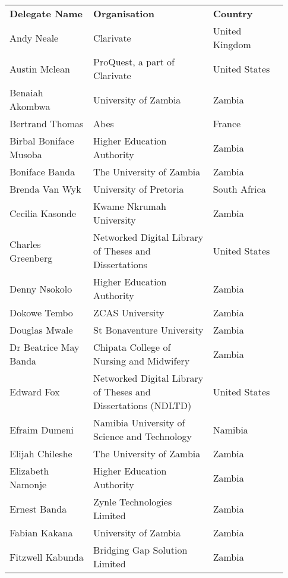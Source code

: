 
\begin{center}
\begin{longtable}{p{0.28\linewidth} p{0.4\linewidth} p{0.25\linewidth}}
\toprule
\textbf{Delegate Name} & \textbf{Organisation} & \textbf{Country} \\
\usepackage{booktabs}
\midrule
Andy Neale & Clarivate & United Kingdom \\  \hline
Austin Mclean & ProQuest, a part of Clarivate & United States \\  \hline
Benaiah Akombwa & University of Zambia & Zambia \\  \hline
Bertrand Thomas & Abes & France \\  \hline
Birbal Boniface Musoba & Higher Education Authority & Zambia \\  \hline
Boniface Banda & The University of Zambia & Zambia \\  \hline
Brenda Van Wyk & University of Pretoria & South Africa \\  \hline
Cecilia Kasonde & Kwame Nkrumah University & Zambia \\  \hline
Charles Greenberg & Networked Digital Library of Theses and Dissertations & United States \\  \hline
Denny Nsokolo & Higher Education Authority & Zambia \\  \hline
Dokowe Tembo & ZCAS University & Zambia \\  \hline
Douglas Mwale & St Bonaventure University & Zambia \\  \hline
Dr Beatrice May Banda & Chipata College of Nursing and Midwifery & Zambia \\  \hline
Edward Fox & Networked Digital Library of Theses and Dissertations (NDLTD) & United States \\  \hline
Efraim Dumeni & Namibia University of Science and Technology & Namibia \\  \hline
Elijah Chileshe & The University of Zambia & Zambia \\  \hline
Elizabeth Namonje & Higher Education Authority & Zambia \\  \hline
Ernest Banda & Zynle Technologies Limited & Zambia \\  \hline
Fabian Kakana & University of Zambia & Zambia \\  \hline
Fitzwell Kabunda & Bridging Gap Solution Limited & Zambia \\  \hline

\end{longtable}
\end{center}
